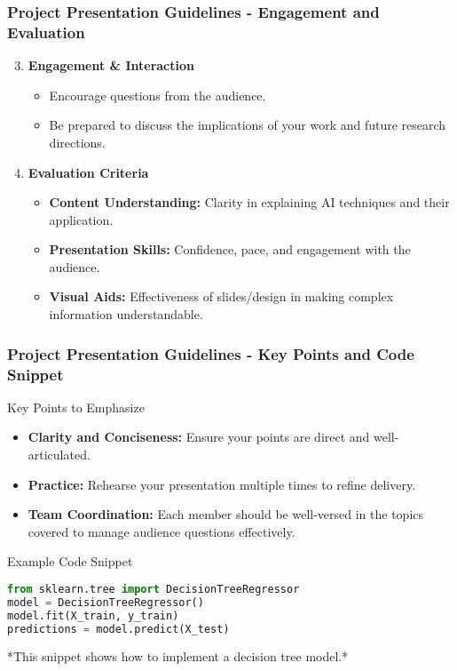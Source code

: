 \documentclass[aspectratio=169]{beamer}
\begin{document}
\begin{frame}[fragile]
    \frametitle{Project Presentation Guidelines - Engagement and Evaluation}
    \begin{enumerate}
        \setcounter{enumi}{2}
        \item \textbf{Engagement \& Interaction}
            \begin{itemize}
                \item Encourage questions from the audience.
                \item Be prepared to discuss the implications of your work and future research directions.
            \end{itemize}

        \item \textbf{Evaluation Criteria}
            \begin{itemize}
                \item \textbf{Content Understanding:} Clarity in explaining AI techniques and their application.
                \item \textbf{Presentation Skills:} Confidence, pace, and engagement with the audience.
                \item \textbf{Visual Aids:} Effectiveness of slides/design in making complex information understandable.
            \end{itemize}
    \end{enumerate}
\end{frame}

\begin{frame}[fragile]
    \frametitle{Project Presentation Guidelines - Key Points and Code Snippet}
    \begin{block}{Key Points to Emphasize}
        \begin{itemize}
            \item \textbf{Clarity and Conciseness:} Ensure your points are direct and well-articulated.
            \item \textbf{Practice:} Rehearse your presentation multiple times to refine delivery.
            \item \textbf{Team Coordination:} Each member should be well-versed in the topics covered to manage audience questions effectively.
        \end{itemize}
    \end{block}

    \begin{block}{Example Code Snippet}
    \begin{lstlisting}[language=Python]
from sklearn.tree import DecisionTreeRegressor
model = DecisionTreeRegressor()
model.fit(X_train, y_train)
predictions = model.predict(X_test)
    \end{lstlisting}
    *This snippet shows how to implement a decision tree model.*
    \end{block}
\end{frame}
\end{document}
